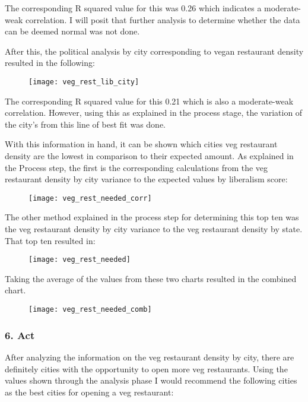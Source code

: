 \documentclass[
]{article}
\begin{document}
The corresponding R squared value for this was 0.26 which indicates a
moderate-weak correlation. I will posit that further analysis to
determine whether the data can be deemed normal was not done.

After this, the political analysis by city corresponding to vegan
restaurant density resulted in the following:

\begin{figure}
\texttt{[image: veg\_rest\_lib\_city]} \end{figure}

The corresponding R squared value for this 0.21 which is also a
moderate-weak correlation. However, using this as explained in the
process stage, the variation of the city's from this line of best fit
was done.

With this information in hand, it can be shown which cities veg
restaurant density are the lowest in comparison to their expected
amount. As explained in the Process step, the first is the corresponding
calculations from the veg restaurant density by city variance to the
expected values by liberalism score:

\begin{figure}
\texttt{[image: veg\_rest\_needed\_corr]} \end{figure}

The other method explained in the process step for determining this top
ten was the veg restaurant density by city variance to the veg
restaurant density by state. That top ten resulted in:

\begin{figure}
\texttt{[image: veg\_rest\_needed]} \end{figure}

Taking the average of the values from these two charts resulted in the
combined chart.

\begin{figure}
\texttt{[image: veg\_rest\_needed\_comb]} \end{figure}

\subsubsection{6. Act}\label{act}

After analyzing the information on the veg restaurant density by city,
there are definitely cities with the opportunity to open more veg
restaurants. Using the values shown through the analysis phase I would
recommend the following cities as the best cities for opening a veg
restaurant:
\end{document}
